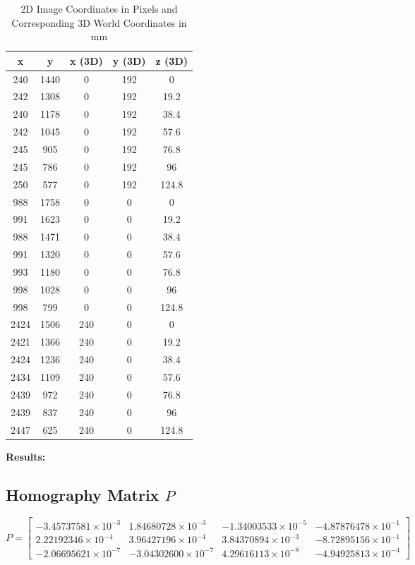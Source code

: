 \documentclass{article}
\begin{document}
\begin{table}[h!]
    \centering
    \begin{tabular}{|c|c|c|c|c|}
    \hline
    \textbf{x} & \textbf{y} & \textbf{x} (3D) & \textbf{y} (3D) & \textbf{z} (3D) \\
    \hline
    240 & 1440 & 0 & 192 & 0 \\
    242 & 1308 & 0 & 192 & 19.2 \\
    240 & 1178 & 0 & 192 & 38.4 \\
    242 & 1045 & 0 & 192 & 57.6 \\
    245 & 905 & 0 & 192 & 76.8 \\
    245 & 786 & 0 & 192 & 96 \\
    250 & 577 & 0 & 192 & 124.8 \\
    988 & 1758 & 0 & 0 & 0 \\
    991 & 1623 & 0 & 0 & 19.2 \\
    988 & 1471 & 0 & 0 & 38.4 \\
    991 & 1320 & 0 & 0 & 57.6 \\
    993 & 1180 & 0 & 0 & 76.8 \\
    998 & 1028 & 0 & 0 & 96 \\
    998 & 799 & 0 & 0 & 124.8 \\
    2424 & 1506 & 240 & 0 & 0 \\
    2421 & 1366 & 240 & 0 & 19.2 \\
    2424 & 1236 & 240 & 0 & 38.4 \\
    2434 & 1109 & 240 & 0 & 57.6 \\
    2439 & 972 & 240 & 0 & 76.8 \\
    2439 & 837 & 240 & 0 & 96 \\
    2447 & 625 & 240 & 0 & 124.8 \\
    \hline
    \end{tabular}
    \caption{2D Image Coordinates in Pixels and Corresponding 3D World Coordinates in mm}
    \end{table}

\textbf{Results:} \\

\subsection*{Homography Matrix \( P \)}
\[
P =
\begin{bmatrix}
-3.45737581 \times 10^{-3} & 1.84680728 \times 10^{-3} & -1.34003533 \times 10^{-5} & -4.87876478 \times 10^{-1} \\
2.22192346 \times 10^{-4} & 3.96427196 \times 10^{-4} & 3.84370894 \times 10^{-3} & -8.72895156 \times 10^{-1} \\
-2.06695621 \times 10^{-7} & -3.04302600 \times 10^{-7} & 4.29616113 \times 10^{-8} & -4.94925813 \times 10^{-4}
\end{bmatrix}
\]
\end{document}
